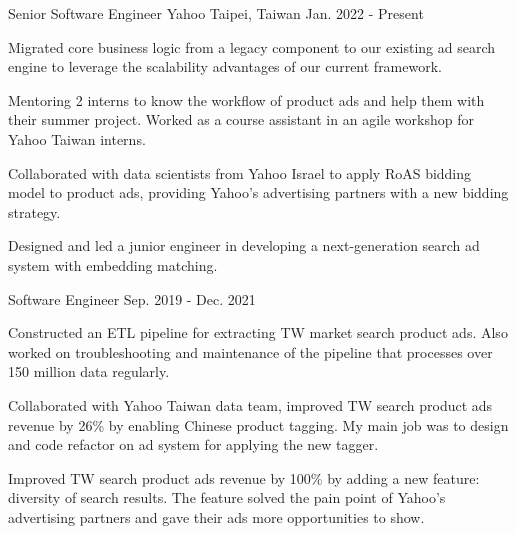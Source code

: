 

\begin{cventries}

  \cventry
    {Senior Software Engineer} %
    {Yahoo} %
    {Taipei, Taiwan} %
    {Jan. 2022 - Present} %
    {
      \begin{cvitems} %
        \item {Migrated core business logic from a legacy component to our existing ad search engine to leverage the scalability advantages of our current framework.}
        \item {Mentoring 2 interns to know the workflow of product ads and help them with their summer project. Worked as a course assistant in an agile workshop for Yahoo Taiwan interns.}
        \item {Collaborated with data scientists from Yahoo Israel to apply RoAS bidding model to product ads, providing Yahoo's advertising partners with a new bidding strategy.}
        \item {Designed and led a junior engineer in developing a next-generation search ad system with embedding matching.}
      \end{cvitems}
    }

  \cventry
    {Software Engineer} %
    {} %
    {} %
    {Sep. 2019 - Dec. 2021} %
    {
      \begin{cvitems} %
        \item {Constructed an ETL pipeline for extracting TW market search product ads. Also worked on troubleshooting and maintenance of the pipeline that processes over 150 million data regularly.}
        \item {Collaborated with Yahoo Taiwan data team, improved TW search product ads revenue by 26\% by enabling Chinese product tagging. My main job was to design and code refactor on ad system for applying the new tagger.}
        \item {Improved TW search product ads revenue by 100\% by adding a new feature: diversity of search results. The feature solved the pain point of Yahoo's advertising partners and gave their ads more opportunities to show.}
      \end{cvitems}
    }


\end{cventries}

